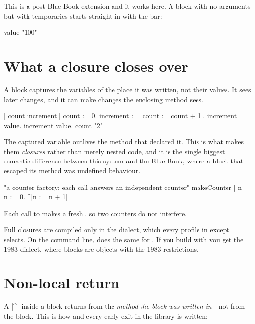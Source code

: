 This is a post-Blue-Book extension and it works here. A block with no
arguments but with temporaries starts straight in with the bar:

\begin{st}
[ | t | t := 10. t squared ] value       "100"
\end{st}

\section{What a closure closes over}

A block captures the variables of the place it was written, not their values.
It sees later changes, and it can make changes the enclosing method sees.

\begin{st}
| count increment |
count := 0.
increment := [count := count + 1].
increment value.
increment value.
count                                     "2"
\end{st}

The captured variable outlives the method that declared it. This is what makes
them \emph{closures} rather than merely nested code, and it is the single
biggest semantic difference between this system and the Blue Book, where a
block that escaped its method was undefined behaviour.

\begin{st}
"a counter factory: each call answers an independent counter"
makeCounter
    | n |
    n := 0.
    ^[n := n + 1]
\end{st}

Each call to  makes a fresh , so two counters do not
interfere.

\begin{stnote}
Full closures are compiled only in the  dialect, which every
profile in  except  selects. On the command line,
 does the same for . If you build with
 you get the 1983 dialect, where blocks are
 objects with the 1983 restrictions.
\end{stnote}

\section{Non-local return}

A \ct|^| inside a block returns from the \emph{method the block was written
in}---not from the block. This is how  and every early exit
in the library is written:

